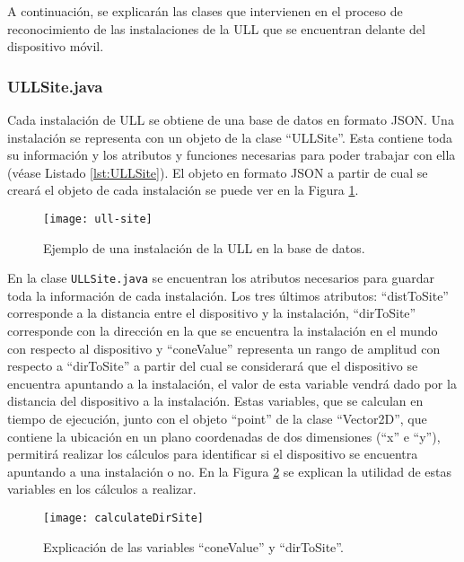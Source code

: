 A continuación, se explicarán las clases que intervienen en el proceso de reconocimiento de las instalaciones de la ULL que se encuentran delante del dispositivo móvil.

\subsubsection{ULLSite.java}

Cada instalación de ULL se obtiene de una base de datos en formato JSON. Una instalación se representa con un objeto de la clase ``ULLSite''. Esta contiene toda su información y los atributos y funciones necesarias para poder trabajar con ella (véase Listado \ref{lst:ULLSite}). El objeto en formato JSON a partir de cual se creará el objeto de cada instalación se puede ver en la Figura \ref{fig:ull-site}.



\begin{figure}[h] 
    \centering
    \texttt{[image: ull-site]}
    \caption{Ejemplo de una instalación de la ULL en la base de datos.}
    \label{fig:ull-site}
\end{figure}

En la clase \texttt{ULLSite.java} se encuentran los atributos necesarios para guardar toda la información de cada instalación. Los tres últimos atributos:  ``distToSite'' corresponde a la distancia entre el dispositivo y la instalación, ``dirToSite'' corresponde con la dirección en la que se encuentra la instalación en el mundo con respecto al dispositivo y ``coneValue'' representa un rango de amplitud  con respecto a ``dirToSite'' a partir del cual se considerará que el dispositivo se encuentra apuntando a la instalación, el valor de esta variable vendrá dado por la distancia del dispositivo a la instalación. Estas variables, que se calculan en tiempo de ejecución, junto con el objeto ``point'' de la clase ``Vector2D'', que contiene la ubicación en un plano coordenadas de dos dimensiones (``x'' e ``y''), permitirá realizar los cálculos para identificar si el dispositivo se encuentra apuntando a una instalación o no. En la Figura \ref{fig:dirSite} se explican la utilidad de estas variables en los cálculos a realizar.

\begin{figure}[h] 
    \centering
    \texttt{[image: calculateDirSite]}
    \caption{Explicación de las variables ``coneValue'' y ``dirToSite''.}
    \label{fig:dirSite}
\end{figure}

